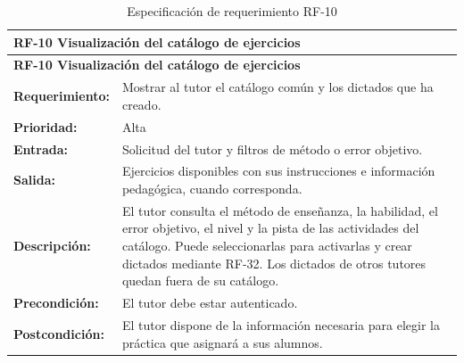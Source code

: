 \begin{longtable}{|p{3.2cm}|p{11.8cm}|}
\caption{Especificación de requerimiento RF-10}\label{tab:rf10} \\ \hline
\multicolumn{2}{|p{15cm}|}{\textbf{RF-10 Visualización del catálogo de ejercicios}} \\ \hline
\endfirsthead
\hline
\multicolumn{2}{|p{15cm}|}{\textbf{RF-10 Visualización del catálogo de ejercicios}} \\ \hline
\endhead
\textbf{Requerimiento:} & Mostrar al tutor el catálogo común y los dictados que ha creado. \\ \hline
\textbf{Prioridad:} & Alta \\ \hline
\textbf{Entrada:} & Solicitud del tutor y filtros de método o error objetivo. \\ \hline
\textbf{Salida:} & Ejercicios disponibles con sus instrucciones e información pedagógica, cuando corresponda. \\ \hline
\textbf{Descripción:} & El tutor consulta el método de enseñanza, la habilidad, el error objetivo, el nivel y la pista de las actividades del catálogo. Puede seleccionarlas para activarlas y crear dictados mediante RF-32. Los dictados de otros tutores quedan fuera de su catálogo. \\ \hline
\textbf{Precondición:} & El tutor debe estar autenticado. \\ \hline
\textbf{Postcondición:} & El tutor dispone de la información necesaria para elegir la práctica que asignará a sus alumnos. \\ \hline
\end{longtable}


